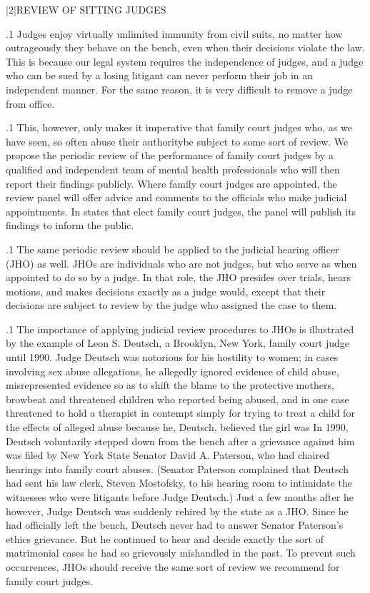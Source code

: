 \documentclass[11pt, twoside]{article}
\begin{document}
{\s|2|{REVIEW OF SITTING JUDGES}

\p.1{%
\noindent{}Judges enjoy virtually unlimited immunity from civil suits, no matter
how outrageously they behave on the bench, even when their decisions
violate the law. This is because our legal system requires the independence of judges, and a judge who can be sued by a losing litigant can
never perform their job in an independent manner. For the same reason,
it is very difficult to remove a judge from office.
}%

\p.1{%
This, however, only makes it imperative that family court judges\mdash{}
who, as we have seen, so often abuse their authority\mdash{}be subject to
some sort of review. We propose the periodic review of the performance
of family court judges by a qualified and independent team of mental
health professionals who will then report their findings publicly. Where
family court judges are appointed, the review panel will offer advice and
comments to the officials who make judicial appointments. In states that
elect family court judges, the panel will publish its findings to inform the
public.
}%

\p.1{%
The same periodic review should be applied to the judicial hearing
officer (JHO) as well. JHOs are individuals who are not judges, but who
serve as  when appointed to do so by a judge. In that role, the
JHO presides over trials, hears motions, and makes decisions exactly
as a judge would, except that their decisions are subject to review by the
judge who assigned the case to them.
}%

\p.1{%
The importance of applying judicial review procedures to JHOs is illustrated by the example of Leon S. Deutsch, a Brooklyn, New York,
family court judge until 1990. Judge Deutsch was notorious for his hostility to women; in cases involving sex abuse allegations, he allegedly
ignored evidence of child abuse, misrepresented evidence so as to shift
the blame to the protective mothers, browbeat and threatened children
who reported being abused, and in one case threatened to hold a therapist in contempt simply for trying to treat a child for the effects of
alleged abuse because he, Deutsch, believed the girl was  In 1990,
Deutsch voluntarily stepped down from the bench after a grievance
against him was filed by New York State Senator David A. Paterson, who
had chaired hearings into family court abuses. (Senator Paterson complained that Deutsch had sent his law clerk, Steven Mostofsky, to his
hearing room to intimidate the witnesses who were litigants before Judge
Deutsch.) Just a few months after he  however, Judge Deutsch
was suddenly rehired by the state as a JHO. Since he had officially left the
bench, Deutsch never had to answer Senator Paterson’s ethics grievance.
But he continued to hear and decide exactly the sort of matrimonial
cases he had so grievously mishandled in the past. To prevent such occurrences, JHOs should receive the same sort of review we recommend
for family court judges.
}%

}
\end{document}
